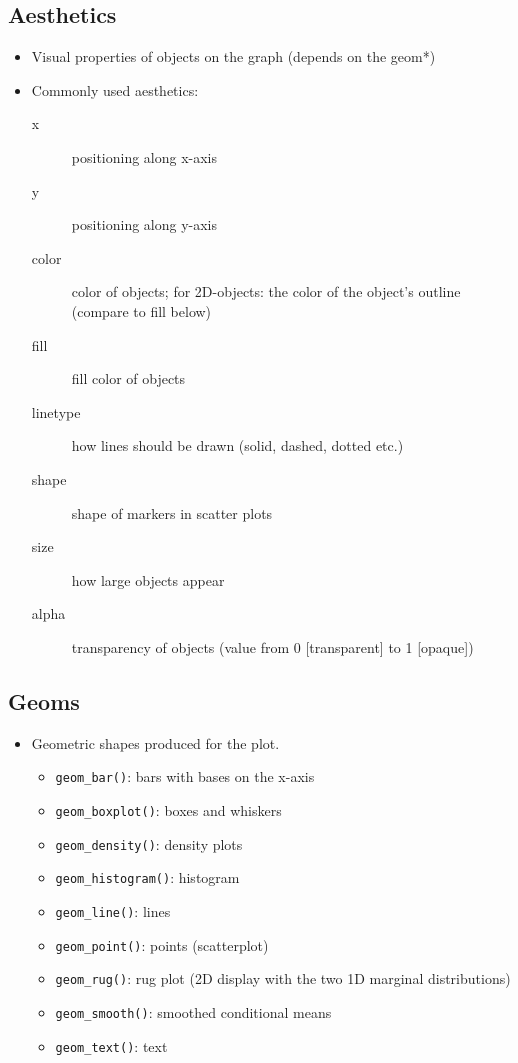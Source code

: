 \documentclass[a4paper]{article}
\begin{document}
		\subsection{Aesthetics}
		
		\begin{itemize}
			\item Visual properties of objects on the graph (depends on the geom*)
			\item Commonly used aesthetics:
				\begin{description}
					\item[x] positioning along x-axis
					\item[y] positioning along y-axis
					\item[color] color of objects; for 2D-objects: the color of the object's outline (compare to fill below)
					\item[fill] fill color of objects
					\item[linetype] how lines should be drawn (solid, dashed, dotted etc.)
					\item[shape] shape of markers in scatter plots
					\item[size] how large objects appear
					\item[alpha] transparency of objects (value from 0 [transparent] to 1 [opaque])
				\end{description}
		\end{itemize}
	
		\subsection{Geoms}
		
		\begin{itemize}
			\item Geometric shapes produced for the plot.
				\begin{itemize}
					\item \texttt{geom\_bar()}: bars with bases on the x-axis
					\item \texttt{geom\_boxplot()}: boxes and whiskers
					\item \texttt{geom\_density()}: density plots
					\item \texttt{geom\_histogram()}: histogram
					\item \texttt{geom\_line()}: lines
					\item \texttt{geom\_point()}: points (scatterplot)
					\item \texttt{geom\_rug()}: rug plot (2D display with the two 1D marginal distributions)
					\item \texttt{geom\_smooth()}: smoothed conditional means
					\item \texttt{geom\_text()}: text
				\end{itemize}
		\end{itemize}
	
\end{document}
